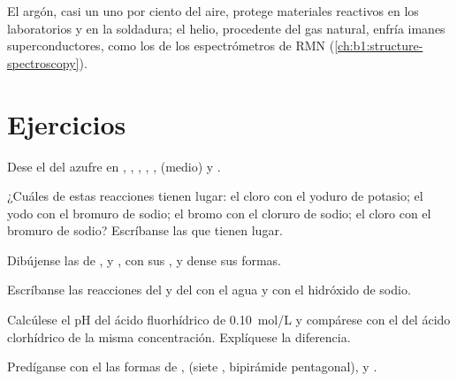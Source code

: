 El argón, casi un uno por ciento del aire, protege materiales reactivos en los
laboratorios y en la soldadura; el helio, procedente del gas natural,
enfría imanes superconductores, como los de los espectrómetros de RMN
(\cref{ch:b1:structure-spectroscopy}).

\section{Ejercicios}

\begin{exercise}[$\star$]\label{exo:b1:p-block-16-18:1}
Dese el  del azufre en , , ,
, ,  (medio) y .
\end{exercise}

\begin{exercise}[$\star$]\label{exo:b1:p-block-16-18:2}
¿Cuáles de estas reacciones tienen lugar: el cloro con el yoduro de
potasio; el yodo con el bromuro de sodio; el bromo con el cloruro de
sodio; el cloro con el bromuro de sodio? Escríbanse las que tienen lugar.
\end{exercise}

\begin{exercise}[$\star$]\label{exo:b1:p-block-16-18:3}
Dibújense las  de ,  y , con
sus , y dense sus formas.
\end{exercise}

\begin{exercise}[$\star$]\label{exo:b1:p-block-16-18:4}
Escríbanse las reacciones del  y del  con el agua y con
el hidróxido de sodio.
\end{exercise}

\begin{exercise}[$\star\star$]\label{exo:b1:p-block-16-18:5}
Calcúlese el pH del ácido fluorhídrico de \qty{0.10}{mol/L} y compárese
con el del ácido clorhídrico de la misma concentración. Explíquese la
diferencia.
\end{exercise}

\begin{exercise}[$\star\star$]\label{exo:b1:p-block-16-18:6}
Predíganse con el  las formas de ,  (siete
, bipirámide pentagonal),  y .
\end{exercise}

